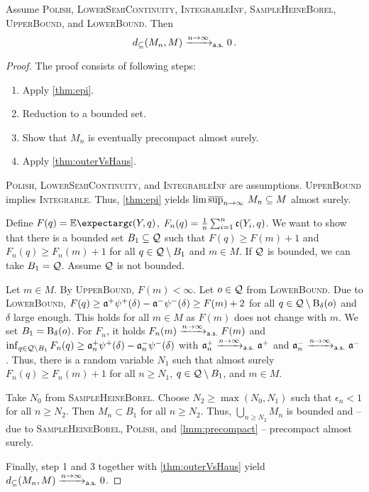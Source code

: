 %
\begin{theorem}\label{thm:consistency}
	Assume \textsc{Polish}, \textsc{LowerSemiContinuity}, \textsc{IntegrableInf},  \textsc{SampleHeineBorel}, \textsc{UpperBound}, and \textsc{LowerBound}. Then
	\begin{equation*}
		d_\subseteq(M_n, M) \xrightarrow{n\to\infty}_{\mathsf{a.s.}} 0
		\, .
	\end{equation*}
\end{theorem}
%
\begin{proof}
The proof consists of following steps:
\begin{enumerate}
\item Apply \autoref{thm:epi}.
\item Reduction to a bounded set.
\item Show that $M_n$ is eventually precompact almost surely.
\item Apply \autoref{thm:outerVsHaus}.
\end{enumerate}
%
\noindent
\underline{}
\textsc{Polish}, \textsc{LowerSemiContinuity}, and \textsc{IntegrableInf} are assumptions. \textsc{UpperBound} implies \textsc{Integrable}. Thus, \autoref{thm:epi} yields $\operatorname*{lim\, \overline{sup}}_{n\to\infty}\, M_n \subseteq M$ almost surely.

\noindent
\underline{}
Define $F(q) = \Ex{\mf c(Y, q)}$, $F_n(q) = \frac1n\sum_{i=1}^n \mathfrak{c}(Y_i, q)$. 
We want to show that there is a bounded set $B_1 \subseteq \mathcal{Q}$ such that $F(q) \geq F(m) + 1$ and $F_n(q) \geq F_n(m) + 1$ for all $q\in \mathcal{Q} \setminus B_1$ and $m \in M$. If $\mathcal{Q}$ is bounded, we can take $B_1 = \mathcal{Q}$. Assume $\mathcal{Q}$ is not bounded. 

Let $m \in M$. By \textsc{UpperBound}, $F(m) < \infty$. Let $o\in\mathcal{Q}$ from \textsc{LowerBound}.
Due to \textsc{LowerBound}, $F(q) \geq \mathfrak{a}^+ \psi^+(\delta) - \mathfrak{a}^- \psi^-(\delta) \geq  F(m) + 2$ for all $q\in\mathcal{Q}\setminus \operatorname{\mathrm{B}}_\delta(o)$ and $\delta$ large enough. This holds for all $m\in M$ as $F(m)$ does not change with $m$. We set $B_1 = \operatorname{\mathrm{B}}_\delta(o)$. For $F_n$, it holds $F_n(m) \xrightarrow{n\to\infty}_{\mathsf{a.s.}} F(m)$ and $\inf_{q\in\mathcal{Q} \setminus B_1} F_n(q) \geq \mathfrak{a}^+_n \psi^+(\delta) - \mathfrak{a}^-_n \psi^-(\delta)$ with $\mathfrak{a}^+_n \xrightarrow{n\to\infty}_{\mathsf{a.s.}} \mathfrak{a}^+$ and $\mathfrak{a}^-_n \xrightarrow{n\to\infty}_{\mathsf{a.s.}} \mathfrak{a}^-$.
Thus, there is a random variable $N_1$ such that almost surely $F_n(q) \geq F_n(m) + 1$ for all $n \geq N_1$, $q\in \mathcal{Q} \setminus B_1$, and $m\in M$.

%
\noindent
\underline{}
Take $N_0$ from \textsc{SampleHeineBorel}. Choose $N_2\geq \max(N_0, N_1)$ such that $\epsilon_n < 1$ for all $n \geq N_2$. Then $M_n \subset B_1$ for all $n\geq N_2$. Thus, $\bigcup_{n\geq N_2}M_n$ is bounded and -- due to \textsc{SampleHeineBorel}, \textsc{Polish}, and \autoref{lmm:precompact} -- precompact almost surely. 

\noindent
\underline{}
Finally, step 1 and 3 together with \autoref{thm:outerVsHaus} yield $d_\subseteq(M_n, M) \xrightarrow{n\to\infty}_{\mathsf{a.s.}} 0$.
\end{proof}
%
%
%